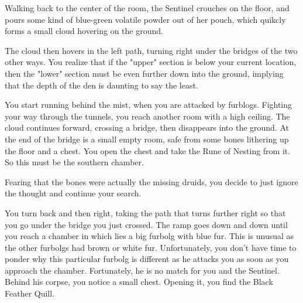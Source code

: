 
Walking back to the center of the room, the Sentinel crouches on the floor, and pours some kind of blue-green volatile powder out of her pouch, which quikcly forms a small cloud hovering on the ground.


The cloud then hovers in the left path, turning right under the bridges of the two other ways. You realize that if the "upper" section is below your current location, then the "lower" section must be even further down into the ground, implying that the depth of the den is daunting to say the least.

You start running behind the mist, when you are attacked by furblogs. Fighting your way through the tunnels, you reach another room with a high ceiling. The cloud continues forward, crossing a bridge, then disappears into the ground. At the end of the bridge is a small empty room, safe from some bones lithering up the floor and a chest. You open the chest and take the Rune of Nesting from it. So this must be the southern chamber.


Fearing that the bones were actually the missing druids, you decide to just ignore the thought and continue your search.



You turn back and then right, taking the path that turns further right so that you go under the bridge you just crossed. The ramp goes down and down until you reach a chamber in which lies a big furbolg with blue fur. This is unusual as the other furbolgs had brown or white fur. Unfortunately, you don't have time to ponder why this particular furbolg is different as he attacks you as soon as you approach the chamber. Fortunately, he is no match for you and the Sentinel. Behind his corpse, you notice a small chest. Opening it, you find the Black Feather Quill.


